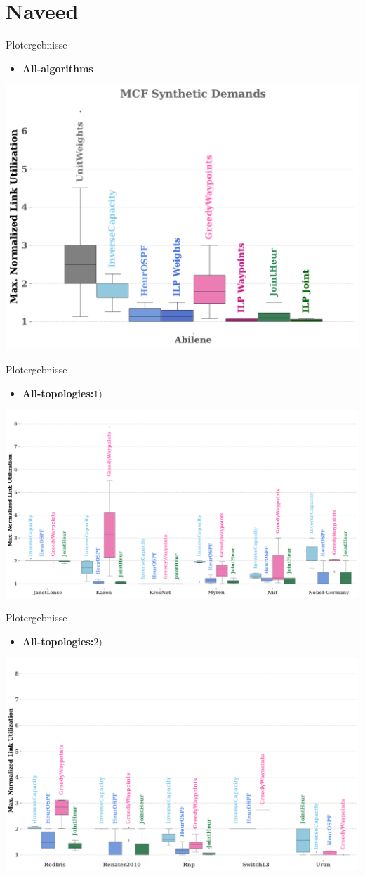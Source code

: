 \documentclass[aspectratio=169,10pt]{beamer}
\begin{document}
\section{Naveed}
\begin{frame}[fragile]{Plotergebnisse}
\begin{itemize}
    \item \textbf{All-algorithms}
\end{itemize}
\begin{center}
    \includegraphics[width=.6\textwidth]{images/naveed_1.pdf}
\end{center}
\end{frame}
\begin{frame}[fragile]{Plotergebnisse}
\begin{itemize}
    \item \textbf{All-topologies:}\newline $1)$
\end{itemize}
\begin{center}
    \includegraphics[width=.7\textwidth]{images/naveed_3.pdf}
\end{center}
\end{frame}
\begin{frame}[fragile]{Plotergebnisse}
\begin{itemize}
    \item \textbf{All-topologies:}\newline $2)$
\end{itemize}
\begin{center}
    \includegraphics[width=.7\textwidth]{images/naveed_4.pdf}
\end{center}
\end{frame}
\end{document}

